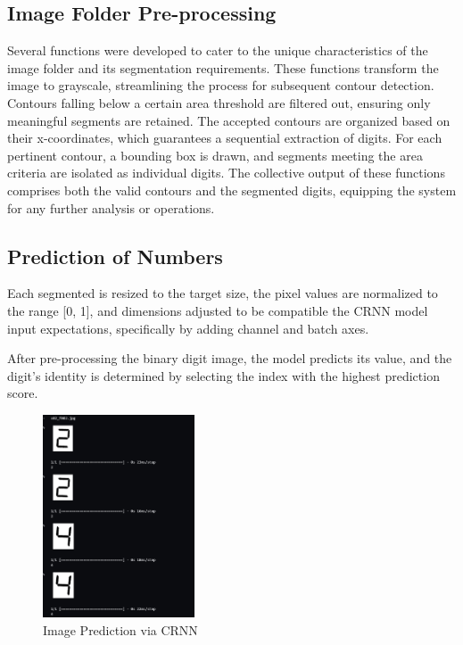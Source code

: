 \subsection{Image Folder Pre-processing}

Several functions were developed to cater to the unique characteristics of the image folder and its segmentation requirements. These functions transform the image to grayscale, streamlining the process for subsequent contour detection. Contours falling below a certain area threshold are filtered out, ensuring only meaningful segments are retained. The accepted contours are organized based on their x-coordinates, which guarantees a sequential extraction of digits. For each pertinent contour, a bounding box is drawn, and segments meeting the area criteria are isolated as individual digits. The collective output of these functions comprises both the valid contours and the segmented digits, equipping the system for any further analysis or operations.

\subsection{Prediction of Numbers}

Each segmented is resized to the target size, the pixel values are normalized to the range [0, 1], and dimensions adjusted to be compatible the CRNN model input expectations, specifically by adding channel and batch axes.

After pre-processing the binary digit image, the model predicts its value, and the digit's identity is determined by selecting the index with the highest prediction score.

\begin{figure}[ht]
    \centering
    \includegraphics[width=0.4\textwidth]{Figures/Results/crnn/sample_predict.jpg}
    \caption[Image Prediction via CRNN]{Image Prediction via CRNN}
    \label{fig:Image Prediction via CRNN}
\end{figure}

